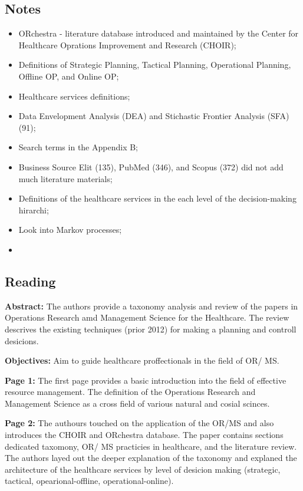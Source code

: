\subsection{Notes}
    \begin{itemize}
        \item ORchestra - literature database introduced and maintained by the Center for Healthcare Oprations Improvement and Research (CHOIR);
        \item Definitions of Strategic Planning, Tactical Planning, Operational Planning, Offline OP, and Online OP;
        \item Healthcare services definitions;
        \item Data Envelopment Analysis (DEA) and Stichastic Frontier Analysis (SFA) (91);
        \item Search terms in the Appendix B;
        \item Business Source Elit (135), PubMed (346), and Scopus (372) did not add much literature materials;
        \item Definitions of the healthcare services in the each level of the decision-making hirarchi;
        \item Look into Markov processes;
        \item 
    \end{itemize}


\subsection{Reading}
    \textbf{Abstract:}
    The authors provide a taxonomy analysis and review of the papers in Operations Research amd Management Science for the Healthcare. The review descrives the existing techniques (prior 2012) for making a planning and controll desicions.
    
    \textbf{Objectives:}
    Aim to guide healthcare proffectionals in the field of OR/ MS.

    
    \textbf{Page 1:}
    The first page provides a basic introduction into the field of effective resource management. The definition of the Operations Research and Management Science as a cross field of various natural and cosial scinces. 
    
    \textbf{Page 2:}
    The authours touched on the application of the OR/MS and also introduces the CHOIR and ORchestra database. The paper contains sections dedicated taxomony, OR/ MS practicies in healthcare, and the literature review. The authors layed out the deeper explanation of the taxonomy and explaned the architecture of the healthcare services by level of desicion making (strategic, tactical, opearional-offline, operational-online).
    
